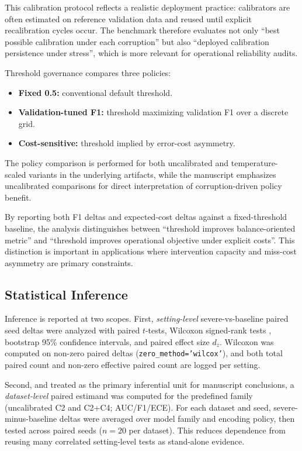 \documentclass{AuthorGuide/ijitcs}
\begin{document}
This calibration protocol reflects a realistic deployment practice: calibrators are often estimated on reference validation data and reused until explicit recalibration cycles occur. The benchmark therefore evaluates not only ``best possible calibration under each corruption'' but also ``deployed calibration persistence under stress'', which is more relevant for operational reliability audits.

Threshold governance compares three policies:
\begin{itemize}
\item \textbf{Fixed 0.5:} conventional default threshold.
\item \textbf{Validation-tuned F1:} threshold maximizing validation F1 over a discrete grid.
\item \textbf{Cost-sensitive:} threshold implied by error-cost asymmetry.
\end{itemize}
The policy comparison is performed for both uncalibrated and temperature-scaled variants in the underlying artifacts, while the manuscript emphasizes uncalibrated comparisons for direct interpretation of corruption-driven policy benefit.

By reporting both F1 deltas and expected-cost deltas against a fixed-threshold baseline, the analysis distinguishes between ``threshold improves balance-oriented metric'' and ``threshold improves operational objective under explicit costs''. This distinction is important in applications where intervention capacity and miss-cost asymmetry are primary constraints.

\subsection{Statistical Inference}
Inference is reported at two scopes. First, \emph{setting-level} severe-vs-baseline paired seed deltas were analyzed with paired $t$-tests, Wilcoxon signed-rank tests \cite{wilcoxon1945individual}, bootstrap 95\% confidence intervals, and paired effect size $d_z$. Wilcoxon was computed on non-zero paired deltas (\texttt{zero\_method='wilcox'}), and both total paired count and non-zero effective paired count are logged per setting.

Second, and treated as the primary inferential unit for manuscript conclusions, a \emph{dataset-level} paired estimand was computed for the predefined family (uncalibrated C2 and C2+C4; AUC/F1/ECE). For each dataset and seed, severe-minus-baseline deltas were averaged over model family and encoding policy, then tested across paired seeds ($n=20$ per dataset). This reduces dependence from reusing many correlated setting-level tests as stand-alone evidence.
\end{document}
